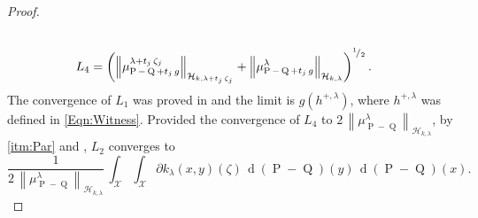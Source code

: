 \begin{proof}
\begin{equation}
\begin{aligned}
						\\
						L_{4}&=\left(\left\|\mu_{\operatorname{P}-\operatorname{Q}+t_{j}\,g}^{\lambda+t_{j}\,\zeta_{j}}\right\|_{\mathcal{H}_{k,\lambda+t_{j}\,\zeta_{j}}}+\left\|\mu_{\operatorname{P}-\operatorname{Q}+t_{j}\,g}^{\lambda}\right\|_{\mathcal{H}_{k,\lambda}}\right)^{^{1}\!/_{2}}.
					\end{aligned}
				\end{equation}
				The convergence of $L_{1}$ was proved in \textcite[Lemma 4]{Carcamo2024} and the limit is $g\left(h^{+,\lambda}\right)$, where $h^{+,\lambda}$ was defined in \eqref{Eqn:Witness}. Provided the convergence of $L_{4}$ to $2\,\left\|\mu_{\operatorname{P}-\operatorname{Q}}^{\lambda}\right\|_{\mathcal{H}_{k,\lambda}}$, by \ref{itm:Par} and \textcite[Theorem 2.27]{Folland2013}, $L_{2}$ converges to
				\begin{equation}
					\frac{1}{2\,\left\|\mu_{\operatorname{P}-\operatorname{Q}}^{\lambda}\right\|_{\mathcal{H}_{k,\lambda}}}\,\int_{\mathcal{X}}\int_{\mathcal{X}}\partial k_{\lambda}(x,y)(\zeta)\,\operatorname{d}(\operatorname{P}-\operatorname{Q})(y)\,\operatorname{d}(\operatorname{P}-\operatorname{Q})(x).
				\end{equation}
				

\end{proof}
